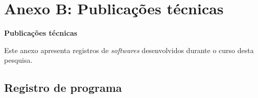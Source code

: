 \chapter{Anexo B: Publicações técnicas}
\label{an:b}
\begin{center}
    \textbf{Publicações técnicas}
\end{center}

Este anexo apresenta registros de \emph{softwares} desenvolvidos durante o curso desta pesquisa.


\section{Registro de programa}
